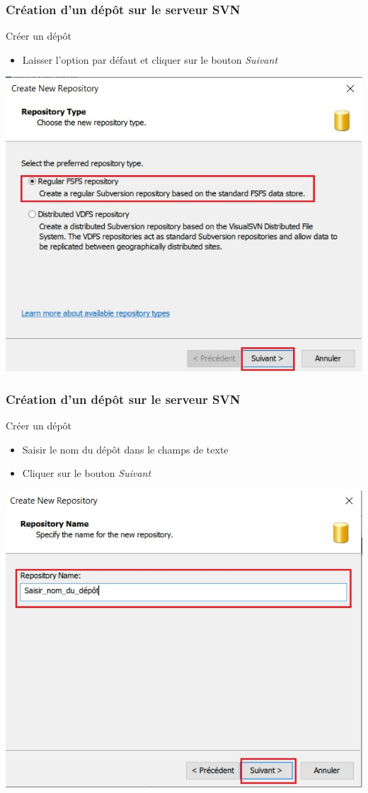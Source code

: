 \documentclass{beamer}
\begin{document}
\begin{frame}
\frametitle{Création d'un dépôt sur le serveur SVN}
\begin{block}{Créer un dépôt}
\begin{itemize}
\item Laisser l'option par défaut et cliquer sur le bouton \alert{\textit{Suivant}}
\end{itemize}
\end{block}
\includegraphics[scale=.5]{../images/server6.jpg}
\end{frame}

\begin{frame}
\frametitle{Création d'un dépôt sur le serveur SVN}
\begin{block}{Créer un dépôt}
\begin{itemize}
\item Saisir le nom du dépôt dans le champs de texte
\item Cliquer sur le bouton \alert{\textit{Suivant}}
\end{itemize}

\end{block}
\includegraphics[scale=.5]{../images/server7.jpg}
\end{frame}
\end{document}
